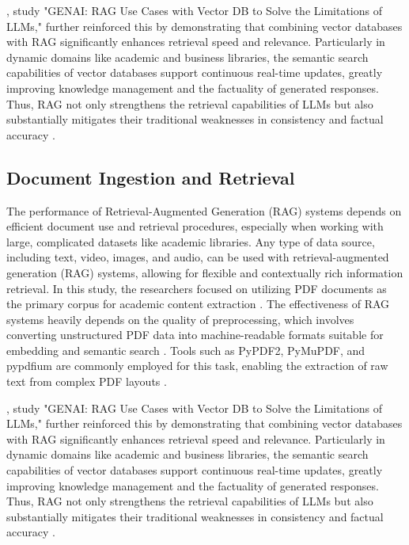 \begin{refsection}
\bigbreak
 \citeauthor{sagi2024genai} \citeyear{sagi2024genai}, study "GENAI: RAG Use Cases with Vector DB to Solve the Limitations of LLMs," further reinforced this by demonstrating that combining vector databases with RAG significantly enhances retrieval speed and relevance. Particularly in dynamic domains like academic and business libraries, the semantic search capabilities of vector databases support continuous real-time updates, greatly improving knowledge management and the factuality of generated responses. Thus, RAG not only strengthens the retrieval capabilities of LLMs but also substantially mitigates their traditional weaknesses in consistency and factual accuracy \cite{sagi2024genai}.


\subsection{Document Ingestion and Retrieval}

The performance of Retrieval-Augmented Generation (RAG) systems depends on efficient document use and retrieval procedures, especially when working with large, complicated datasets like academic libraries. Any type of data source, including text, video, images, and audio, can be used with retrieval-augmented generation (RAG) systems, allowing for flexible and contextually rich information retrieval. In this study, the researchers focused on utilizing PDF documents as the primary corpus for academic content extraction \cite{li2023extracting}. 
\newpage
\clearpage
The effectiveness of RAG systems heavily depends on the quality of preprocessing, which involves converting unstructured PDF data into machine-readable formats suitable for embedding and semantic search \cite{arzideh2024miracle} \cite{aquino2024extracting}. Tools such as PyPDF2, PyMuPDF, and pypdfium are commonly employed for this task, enabling the extraction of raw text from complex PDF layouts \cite{adhikari2024comparative}.

\bigbreak
 \citeauthor{sagi2024genai} \citeyear{sagi2024genai}, study "GENAI: RAG Use Cases with Vector DB to Solve the Limitations of LLMs," further reinforced this by demonstrating that combining vector databases with RAG significantly enhances retrieval speed and relevance. Particularly in dynamic domains like academic and business libraries, the semantic search capabilities of vector databases support continuous real-time updates, greatly improving knowledge management and the factuality of generated responses. Thus, RAG not only strengthens the retrieval capabilities of LLMs but also substantially mitigates their traditional weaknesses in consistency and factual accuracy \cite{sagi2024genai}.


\end{refsection}
